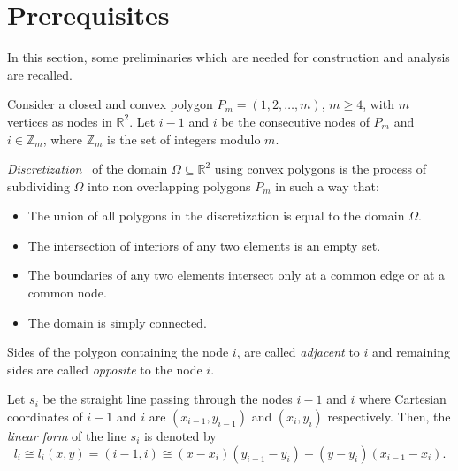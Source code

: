 \section{Prerequisites}\label{sec2}
In this section, some preliminaries which are needed for construction and
analysis are recalled.

Consider a closed and convex polygon $P_m = (1,2,\ldots,m)$, $m \geq 4$, with
$m$ vertices as nodes in $\mathbb{R}^2$. Let $i-1$ and $i$ be the consecutive
nodes of $P_m$ and $i \in \mathbb{Z}_m$, where $\mathbb{Z}_m$ is the set of
integers modulo $m$.

\begin{definition}
  \emph{Discretization}~\cite{phi} of the domain
  $\Omega \subseteq \mathbb{R}^2$ using convex polygons is the process of
  subdividing $\Omega$ into non overlapping polygons $P_m$ in such a way that:
        \begin{itemize}
          \item The union of all polygons in the discretization is equal
                to the domain $\Omega$.
          \item The intersection of interiors of any two elements is an empty
                set.
          \item The boundaries of any two elements intersect only at a
                common edge or at a common node.
          \item The domain is simply connected.
        \end{itemize}
\end{definition}

\begin{definition}
  Sides of the polygon containing the node $i$, are called \emph{adjacent}
  to $i$ and remaining sides are called \emph{opposite} to the node $i$.
\end{definition}

\begin{definition}
  Let $s_{i}$ be the straight line passing through the nodes $i-1$ and $i$
  where Cartesian coordinates of $i-1$ and $i$ are $(x_{i-1},y_{i-1})$ and
  $(x_i,y_i)$ respectively. Then, the \emph{linear form} of the line $s_i$ is
  denoted by
  \begin{equation}\label{r1}
    l_i\cong l_i(x,y)=(i-1,i)\cong (x-x_i)(y_{i-1}-y_i)-(y-y_i)(x_{i-1}-x_i).
  \end{equation}
\end{definition}

